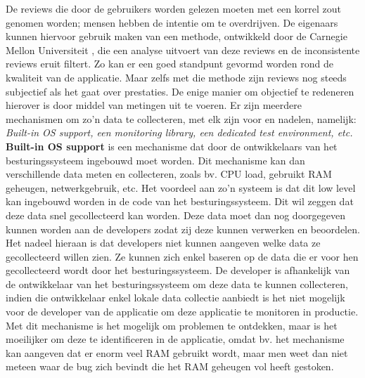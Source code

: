 De reviews die door de gebruikers worden gelezen moeten met een korrel zout genomen worden; mensen hebben de intentie om te overdrijven. De eigenaars kunnen hiervoor gebruik maken van een methode, ontwikkeld door de Carnegie Mellon Universiteit \cite{fu2013people}, die een analyse uitvoert van deze reviews en de inconsistente reviews eruit filtert. Zo kan er een goed standpunt gevormd worden rond de kwaliteit van de applicatie. Maar zelfs met die methode zijn reviews nog steeds subjectief als het gaat over prestaties. De enige manier om objectief te redeneren hierover is door middel van metingen uit te voeren. Er zijn meerdere mechanismen om zo'n data te collecteren, met elk zijn voor en nadelen, namelijk: \textit{Built-in OS support, een monitoring library, een dedicated test environment, etc.}\\

\textbf{Built-in OS support} is een mechanisme dat door de ontwikkelaars van het besturingssysteem ingebouwd moet worden. Dit mechanisme kan dan verschillende data meten en collecteren, zoals bv. CPU load, gebruikt RAM geheugen, netwerkgebruik, etc. Het voordeel aan zo'n systeem is dat dit low level kan ingebouwd worden in de code van het besturingssysteem. Dit wil zeggen dat deze data snel gecollecteerd kan worden. Deze data moet dan nog doorgegeven kunnen worden aan de developers zodat zij deze kunnen verwerken en beoordelen. Het nadeel hieraan is dat developers niet kunnen aangeven welke data ze gecollecteerd willen zien. Ze kunnen zich enkel baseren op de data die er voor hen gecollecteerd wordt door het besturingssysteem. De developer is afhankelijk van de ontwikkelaar van het besturingssysteem om deze data te kunnen collecteren, indien die ontwikkelaar enkel lokale data collectie aanbiedt is het niet mogelijk voor de developer van de applicatie om deze applicatie te monitoren in productie. Met dit mechanisme is het mogelijk om problemen te ontdekken, maar is het moeilijker om deze te identificeren in de applicatie, omdat bv. het mechanisme kan aangeven dat er enorm veel RAM gebruikt wordt, maar men weet dan niet meteen waar de bug zich bevindt die het RAM geheugen vol heeft gestoken.\\

